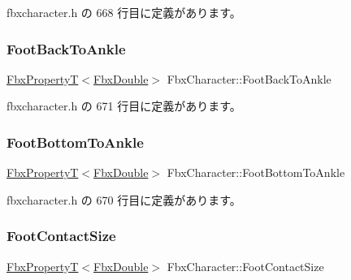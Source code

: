  fbxcharacter.\+h の 668 行目に定義があります。

\mbox{\label{class_fbx_character_ab102035eb8eb712529296a1fd2afb392}} 
\subsubsection{\texorpdfstring{Foot\+Back\+To\+Ankle}{FootBackToAnkle}}
{\footnotesize\ttfamily \hyperlink{class_fbx_property_t}{Fbx\+PropertyT}$<$\hyperlink{fbxtypes_8h_a171e72a1c46fc15c1a6c9c31948c1c5b}{Fbx\+Double}$>$ Fbx\+Character\+::\+Foot\+Back\+To\+Ankle}



 fbxcharacter.\+h の 671 行目に定義があります。

\mbox{\label{class_fbx_character_a8853185ea8fe9870297dcdacce05453c}} 
\subsubsection{\texorpdfstring{Foot\+Bottom\+To\+Ankle}{FootBottomToAnkle}}
{\footnotesize\ttfamily \hyperlink{class_fbx_property_t}{Fbx\+PropertyT}$<$\hyperlink{fbxtypes_8h_a171e72a1c46fc15c1a6c9c31948c1c5b}{Fbx\+Double}$>$ Fbx\+Character\+::\+Foot\+Bottom\+To\+Ankle}



 fbxcharacter.\+h の 670 行目に定義があります。

\mbox{\label{class_fbx_character_ada6c47cdcf03d1119afe2c2cc0c92683}} 
\subsubsection{\texorpdfstring{Foot\+Contact\+Size}{FootContactSize}}
{\footnotesize\ttfamily \hyperlink{class_fbx_property_t}{Fbx\+PropertyT}$<$\hyperlink{fbxtypes_8h_a171e72a1c46fc15c1a6c9c31948c1c5b}{Fbx\+Double}$>$ Fbx\+Character\+::\+Foot\+Contact\+Size}




